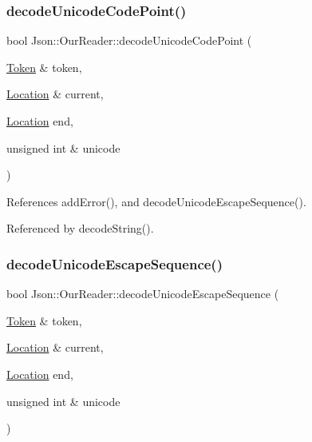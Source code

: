 \subsubsection{\texorpdfstring{decode\+Unicode\+Code\+Point()}{decodeUnicodeCodePoint()}}
{\footnotesize\ttfamily bool Json\+::\+Our\+Reader\+::decode\+Unicode\+Code\+Point (\begin{DoxyParamCaption}\item[{\hyperlink{classJson_1_1OurReader_1_1Token}{Token} \&}]{token,  }\item[{\hyperlink{classJson_1_1OurReader_a1bdc7bbc52ba87cae6b19746f2ee0189_a1bdc7bbc52ba87cae6b19746f2ee0189}{Location} \&}]{current,  }\item[{\hyperlink{classJson_1_1OurReader_a1bdc7bbc52ba87cae6b19746f2ee0189_a1bdc7bbc52ba87cae6b19746f2ee0189}{Location}}]{end,  }\item[{unsigned int \&}]{unicode }\end{DoxyParamCaption})\hspace{0.3cm}{\ttfamily [private]}}



References add\+Error(), and decode\+Unicode\+Escape\+Sequence().



Referenced by decode\+String().

\mbox{\label{classJson_1_1OurReader_adb39be814cc6076b91a0919bdd5b24b0_adb39be814cc6076b91a0919bdd5b24b0}} 
\subsubsection{\texorpdfstring{decode\+Unicode\+Escape\+Sequence()}{decodeUnicodeEscapeSequence()}}
{\footnotesize\ttfamily bool Json\+::\+Our\+Reader\+::decode\+Unicode\+Escape\+Sequence (\begin{DoxyParamCaption}\item[{\hyperlink{classJson_1_1OurReader_1_1Token}{Token} \&}]{token,  }\item[{\hyperlink{classJson_1_1OurReader_a1bdc7bbc52ba87cae6b19746f2ee0189_a1bdc7bbc52ba87cae6b19746f2ee0189}{Location} \&}]{current,  }\item[{\hyperlink{classJson_1_1OurReader_a1bdc7bbc52ba87cae6b19746f2ee0189_a1bdc7bbc52ba87cae6b19746f2ee0189}{Location}}]{end,  }\item[{unsigned int \&}]{unicode }\end{DoxyParamCaption})\hspace{0.3cm}{\ttfamily [private]}}



